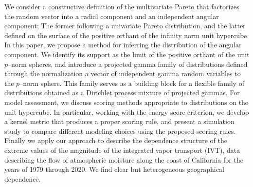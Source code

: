 We consider a constructive definition of the multivariate Pareto that factorizes the 
random vector into a radial component and an independent angular component; The former
following a univariate Pareto distribution, and the latter defined on the surface of the 
positive orthant of the infinity norm unit hypercube.  In this paper, we  propose a method 
for inferring the distribution of the angular component.  We identify its support 
as the limit of the positive orthant of the unit $p$--norm spheres, and introduce a 
projected gamma family of distributions defined through the normalization a vector of 
independent gamma random variables to the $p$--norm sphere.  This family serves as a 
building block for a flexible family of distributions obtained as a Dirichlet process 
mixture of projected gammas.  For model assessment, we discuss scoring methods appropriate 
to distributions on the unit hypercube.  In particular, working with the energy score
criterion, we develop a kernel metric that produces a  proper scoring rule, and present 
a simulation study to compare  different modeling choices using the proposed scoring rules.  
Finally we apply our  approach to describe the dependence structure of the extreme values of 
the magnitude  of the integrated vapor transport (IVT), data describing the flow 
of atmospheric moisture along the coast of California for the years of 1979 
through 2020.  We find clear but heterogeneous geographical dependence.